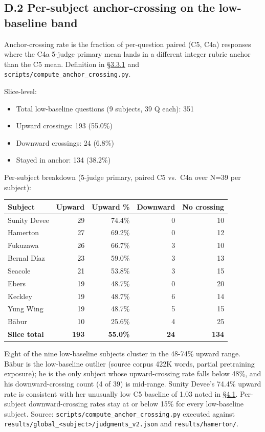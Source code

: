 \hypertarget{d.2-per-subject-anchor-crossing-on-the-low-baseline-band}{%
\subsection{D.2 Per-subject anchor-crossing on the low-baseline
band}\label{d.2-per-subject-anchor-crossing-on-the-low-baseline-band}}

Anchor-crossing rate is the fraction of per-question paired (C5, C4a)
responses where the C4a 5-judge primary mean lands in a different
integer rubric anchor than the C5 mean. Definition in \hyperref[score-interpretation]{§3.3.1} and
\texttt{scripts/compute\_anchor\_crossing.py}.

Slice-level:

\begin{itemize}
\tightlist
\item
  Total low-baseline questions (9 subjects, 39 Q each): 351
\item
  Upward crossings: 193 (55.0\%)
\item
  Downward crossings: 24 (6.8\%)
\item
  Stayed in anchor: 134 (38.2\%)
\end{itemize}

Per-subject breakdown (5-judge primary, paired C5 vs.~C4a over N=39 per
subject):

\begin{longtable}[]{@{}lrrrr@{}}
\toprule
Subject & Upward & Upward \% & Downward & No crossing \\
\midrule
\endhead
Sunity Devee & 29 & 74.4\% & 0 & 10 \\
Hamerton & 27 & 69.2\% & 0 & 12 \\
Fukuzawa & 26 & 66.7\% & 3 & 10 \\
Bernal Díaz & 23 & 59.0\% & 3 & 13 \\
Seacole & 21 & 53.8\% & 3 & 15 \\
Ebers & 19 & 48.7\% & 0 & 20 \\
Keckley & 19 & 48.7\% & 6 & 14 \\
Yung Wing & 19 & 48.7\% & 5 & 15 \\
Bābur & 10 & 25.6\% & 4 & 25 \\
\textbf{Slice total} & \textbf{193} & \textbf{55.0\%} & \textbf{24} &
\textbf{134} \\
\bottomrule
\end{longtable}

Eight of the nine low-baseline subjects cluster in the 48-74\% upward
range. Bābur is the low-baseline outlier (source corpus 422K words,
partial pretraining exposure); he is the only subject whose
upward-crossing rate falls below 48\%, and his downward-crossing count
(4 of 39) is mid-range. Sunity Devee's 74.4\% upward rate is consistent
with her unusually low C5 baseline of 1.03 noted in \hyperref[the-cross-subject-gradient-and-its-per-question-mechanism]{§4.1}. Per-subject
downward-crossing rates stay at or below 15\% for every low-baseline
subject. Source: \texttt{scripts/compute\_anchor\_crossing.py} executed
against
\texttt{results/global\_\textless{}subject\textgreater{}/judgments\_v2.json}
and \texttt{results/hamerton/}.


